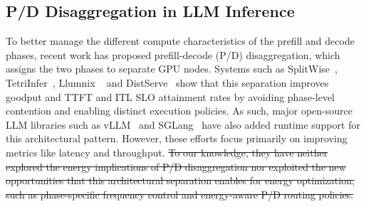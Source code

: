 \subsection{P/D Disaggregation in LLM Inference} 
\label{subsec:pd-dist}

To better manage the different compute characteristics of the prefill and decode phases, recent work has proposed prefill-decode (P/D) disaggregation, which assigns the two phases to separate GPU nodes. Systems such as SplitWise~\cite{patel2024splitwise}, TetriInfer~\cite{hu2024inference}, Llumnix ~\cite{sun2024llumnix} and DistServe~\cite{zhong2024distserve} show that this separation improves goodput and TTFT and ITL SLO attainment rates by avoiding phase-level contention and enabling distinct execution policies.  As such, major open-source LLM libraries such as vLLM~\cite{kwon2023efficient} and SGLang~\cite{zheng2024sglang} have also added runtime support for this architectural pattern. However, these efforts focus primarily on improving metrics like latency and throughput.  \sout{To our knowledge, they have neither explored the energy implications of P/D disaggregation nor exploited the new opportunities that this architectural separation enables for energy optimization, such as phase-specific  frequency control and energy-aware P/D routing policies.} 
